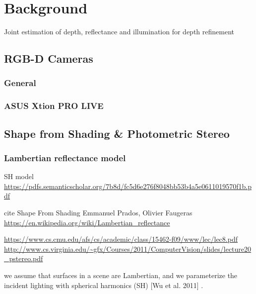 \chapter{Background} \label{chap:background}
Joint estimation of depth, reflectance and illumination for depth refinement

\section{RGB-D Cameras}

\subsection{General}

\subsection{ASUS Xtion PRO LIVE}


\section{Shape from Shading \& Photometric Stereo}
\subsection{Lambertian reflectance model}
SH model \url{https://pdfs.semanticscholar.org/7b8d/fc5d6e276f8048bb53b4a5e0611019570f1b.pdf}
\cite{basri2003lambertian}

cite Shape From Shading Emmanuel Prados, Olivier Faugeras
\url{https://en.wikipedia.org/wiki/Lambertian_reflectance}

\url{https://www.cs.cmu.edu/afs/cs/academic/class/15462-f09/www/lec/lec8.pdf}
\url{http://www.cs.virginia.edu/~gfx/Courses/2011/ComputerVision/slides/lecture20_pstereo.pdf}


we assume that surfaces in a scene are Lambertian, and we parameterize the incident lighting with spherical harmonics (SH) [Wu et al. 2011] \cite{wu2011shading}.

